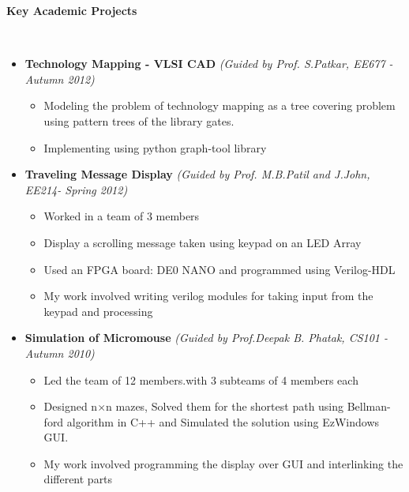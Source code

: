 \documentclass[a4paper,11pt]{article}
\newcommand{\isep}{-2 pt}
\newcommand{\lsep}{-0.5cm}
\newcommand{\resheading}[1]{{\small \colorbox{mygrey}{\begin{minipage}{0.975\textwidth}{\textbf{#1 \vphantom{p\^{E}}}}\end{minipage}}}}
\begin{document}
\resheading{\textbf{\large Key Academic Projects}}\\[\lsep]
\begin{itemize}
    \item \textbf{Technology Mapping - VLSI CAD} \hfill \emph{(Guided by Prof. S.Patkar, EE677 - Autumn 2012)} \\[-0.6cm]
    \begin{itemize} \itemsep \isep
        \item Modeling the problem of technology mapping as a tree covering problem using pattern trees of the library gates.
        \item Implementing using python graph-tool library
    \end{itemize}
\pagebreak

    \item \textbf{Traveling Message Display} \hfill \emph{(Guided by Prof. M.B.Patil and J.John, EE214- Spring 2012)}\\[-0.6cm]
    \begin{itemize}\itemsep \isep
        \item Worked in a team of 3 members
        \item Display a scrolling message taken using keypad on an LED Array
        \item Used an FPGA board: DE0 NANO and programmed using Verilog-HDL
        \item My work involved writing verilog modules for taking input from the keypad and processing
    \end{itemize}
    	\item \textbf{Simulation of Micromouse} \hfill \emph{(Guided by Prof.Deepak B. Phatak, CS101 - Autumn 2010)}\\[-0.6cm]
	\begin{itemize}\itemsep \isep 
	    \item Led the team of 12 members.with 3 subteams of 4 members each
	    \item Designed n$\times$n mazes, Solved them for the shortest path using Bellman-ford algorithm in C++ and Simulated the solution using EzWindows GUI.
	    \item My work involved programming the display over GUI and interlinking the different parts
	\end{itemize} 
\begin{comment}
\item \textbf{Term paper on Working of a Cordless Telephone} \emph{(Guided by Prof. Vasi J. , EE112 - Spring 2011)\\[-0.6cm]}
	\begin{itemize} \itemsep \isep
	  \item Opened and Analyzed a Cordless phone.
	  \item Worked in a team of 3 members.
	  \item Written a 12-page Term paper with details of working of the phone.
	\end{itemize}
\end{comment}
\end{itemize}
\end{document}
